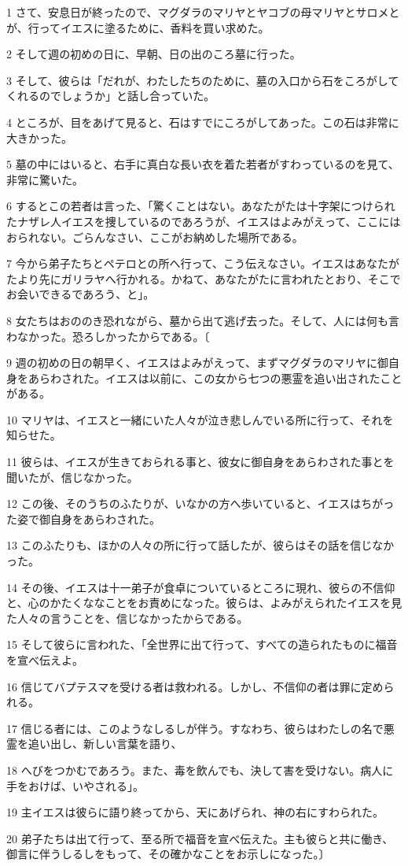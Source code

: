 \par 1 さて、安息日が終ったので、マグダラのマリヤとヤコブの母マリヤとサロメとが、行ってイエスに塗るために、香料を買い求めた。
\par 2 そして週の初めの日に、早朝、日の出のころ墓に行った。
\par 3 そして、彼らは「だれが、わたしたちのために、墓の入口から石をころがしてくれるのでしょうか」と話し合っていた。
\par 4 ところが、目をあげて見ると、石はすでにころがしてあった。この石は非常に大きかった。
\par 5 墓の中にはいると、右手に真白な長い衣を着た若者がすわっているのを見て、非常に驚いた。
\par 6 するとこの若者は言った、「驚くことはない。あなたがたは十字架につけられたナザレ人イエスを捜しているのであろうが、イエスはよみがえって、ここにはおられない。ごらんなさい、ここがお納めした場所である。
\par 7 今から弟子たちとペテロとの所へ行って、こう伝えなさい。イエスはあなたがたより先にガリラヤへ行かれる。かねて、あなたがたに言われたとおり、そこでお会いできるであろう、と」。
\par 8 女たちはおののき恐れながら、墓から出て逃げ去った。そして、人には何も言わなかった。恐ろしかったからである。〔
\par 9 週の初めの日の朝早く、イエスはよみがえって、まずマグダラのマリヤに御自身をあらわされた。イエスは以前に、この女から七つの悪霊を追い出されたことがある。
\par 10 マリヤは、イエスと一緒にいた人々が泣き悲しんでいる所に行って、それを知らせた。
\par 11 彼らは、イエスが生きておられる事と、彼女に御自身をあらわされた事とを聞いたが、信じなかった。
\par 12 この後、そのうちのふたりが、いなかの方へ歩いていると、イエスはちがった姿で御自身をあらわされた。
\par 13 このふたりも、ほかの人々の所に行って話したが、彼らはその話を信じなかった。
\par 14 その後、イエスは十一弟子が食卓についているところに現れ、彼らの不信仰と、心のかたくななことをお責めになった。彼らは、よみがえられたイエスを見た人々の言うことを、信じなかったからである。
\par 15 そして彼らに言われた、「全世界に出て行って、すべての造られたものに福音を宣べ伝えよ。
\par 16 信じてバプテスマを受ける者は救われる。しかし、不信仰の者は罪に定められる。
\par 17 信じる者には、このようなしるしが伴う。すなわち、彼らはわたしの名で悪霊を追い出し、新しい言葉を語り、
\par 18 へびをつかむであろう。また、毒を飲んでも、決して害を受けない。病人に手をおけば、いやされる」。
\par 19 主イエスは彼らに語り終ってから、天にあげられ、神の右にすわられた。
\par 20 弟子たちは出て行って、至る所で福音を宣べ伝えた。主も彼らと共に働き、御言に伴うしるしをもって、その確かなことをお示しになった。〕


